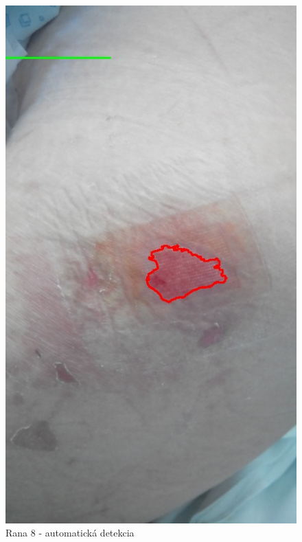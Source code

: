 \begin{figure}[h]
\begin{minipage}{0.48\textwidth}
     \includegraphics[scale=0.35]{fig/8a.jpeg}
      \caption{Rana 8 - automatická detekcia}
      \label{fig:w8d}
   \end{minipage}
\end{figure}

